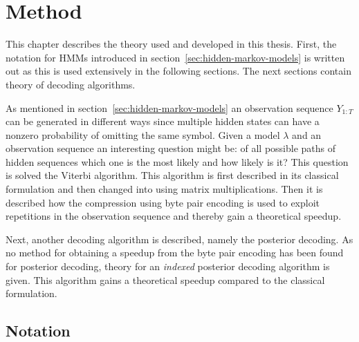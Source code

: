 \chapter{Method}
\label{cha:method}

This chapter describes the theory used and developed in this thesis. First, the
notation for HMMs introduced in section~\ref{sec:hidden-markov-models} is
written out as this is used extensively in the following sections. The next
sections contain theory of decoding algorithms.

As mentioned in section~\ref{sec:hidden-markov-models} an observation sequence
$Y_{1:T}$ can be generated in different ways since multiple hidden states can
have a nonzero probability of omitting the same symbol. Given a model
$\lambda$ and an observation sequence an interesting question might be: of all
possible paths of hidden sequences which one is the most likely and how likely
is it? This question is solved the Viterbi algorithm.  This algorithm is first
described in its classical formulation and then changed into using matrix
multiplications. Then it is described how the compression using byte pair
encoding is used to exploit repetitions in the observation sequence and
thereby gain a theoretical speedup.

Next, another decoding algorithm is described, namely the posterior decoding.
As no method for obtaining a speedup from the byte pair encoding has been found
for posterior decoding, theory for an \emph{indexed} posterior decoding
algorithm is given. This algorithm gains a theoretical speedup compared to the
classical formulation.

\section{Notation}


